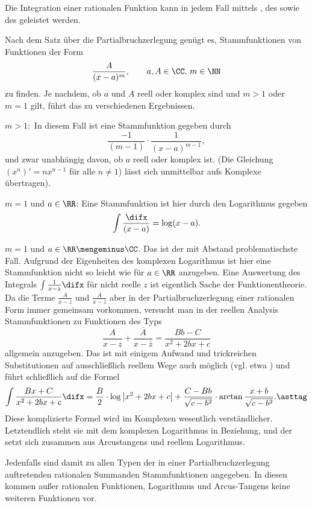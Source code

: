 \begin{antwort}
Die Integration einer rationalen Funktion kann in jedem Fall mittels 
, des 
 sowie des 
geleistet werden. 

Nach dem Satz über die Partialbruchzerlegung genügt es, 
Stammfunktionen von Funktionen der Form
\[
\frac{A}{(x-a)^m}, \qquad\text{$a,A\in \CC,\, m \in \NN$}
\]
zu finden. Je nachdem, ob $a$ und $A$ reell oder komplex sind 
und $m>1$ oder $m=1$ gilt, führt das zu verschiedenen Ergebnissen.

\medskip
\noindent
{} $m>1:$ In diesem Fall ist eine Stammfunktion gegeben durch 
\[
\frac{-1}{(m-1)}\cdot \frac{1}{(x-a)^{m-1}},
\]
und zwar unabhängig davon, ob $a$ reell oder komplex ist. 
(Die Gleichung $(x^{n})'=nx^{n-1}$ für alle $n\not=1$) lässt sich 
unmittelbar aufs Komplexe übertragen).  

\medskip
\noindent
{} $m=1$ und $a\in \RR$: Eine Stammfunktion ist hier durch den 
Logarithmus gegeben
\[
 \int \frac{\difx}{(x-a)}= \log(x-a).
\]

\medskip
\noindent
{} $m=1$ und $a\in \RR\mengeminus\CC$. 
Das ist der mit Abstand problematischste Fall. Aufgrund der  
Eigenheiten des komplexen Logarithmus ist hier eine Stammfunktion 
nicht so leicht wie für $a\in \RR$ anzugeben. Eine Auswertung 
des Integrals $\int \frac{1}{x-z} \difx$ für nicht reelle $z$ 
ist eigentlich Sache der Funktionentheorie. Da die Terme 
$\frac{A}{x-z}$ und $\frac{\overline{A}}{x-\overline{z}}$ 
aber in der Partialbruchzerlegung einer rationalen Form immer 
gemeinsam vorkommen, versucht man in der reellen Analysis 
Stammfunktionen zu Funktionen des Typs  
\[
\frac{A}{x-z} + \frac{\overline{A}}{x-\overline{z}} = 
\frac{Bb-C}{x^2+2bx+c} 
\]
allgemein anzugeben. Das ist mit einigem Aufwand und trickreichen 
Substitutionen auf ausschließlich reellem Wege 
auch möglich (vgl. etwa \citep{Koenig}) und führt schließlich auf die 
Formel 
\begin{equation}
\int \frac{Bx+C}{x^2+2bx+c}\difx = 
\frac{B}{2}\cdot\log\big| x^2+2bx+c \big| + 
\frac{C-Bb}{\sqrt{c-b^2}}\cdot \arctan \frac{x+b}{\sqrt{c-b^2}}.
\asttag
\end{equation}
Diese komplizierte Formel wird im Komplexen wesentlich verständlicher. 
Letztendlich steht sie mit dem komplexen Logarithmus in Beziehung, und der 
setzt sich zusammen aus Arcustangens und reellem Logarithmus. 

Jedenfalls sind damit zu allen Typen der in einer 
Partialbruchzerlegung auftretenden 
rationalen Summanden Stammfunktionen angegeben. In diesen 
kommen außer 
rationalen Funktionen, Logarithmus und Arcus-Tangens keine weiteren 
Funktionen vor. 
\AntEnd
\end{antwort}

